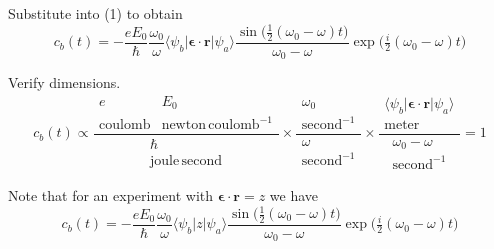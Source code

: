 Substitute into (1) to obtain
\begin{equation*}
c_b(t)=-\frac{eE_0}{\hbar}\frac{\omega_0}{\omega}
\langle\psi_b|\boldsymbol{\epsilon}\cdot\mathbf r|\psi_a\rangle
\frac{\sin\bigl(\tfrac{1}{2}(\omega_0-\omega)t\bigr)}{\omega_0-\omega}
\exp\bigl(\tfrac{i}{2}(\omega_0-\omega)t\bigr)
\end{equation*}

Verify dimensions.
\begin{equation*}
c_b(t)\propto
\frac{\begin{matrix}
e & E_0
\\
\text{coulomb} & \text{newton}\,\text{coulomb}^{-1}
\end{matrix}}
{\begin{matrix}
\hbar
\\
\text{joule}\,\text{second}
\end{matrix}}
\times
\frac{\begin{matrix}
\omega_0
\\
\text{second}^{-1}
\end{matrix}}
{\begin{matrix}
\omega
\\
\text{second}^{-1}
\end{matrix}}
\times
\frac{\begin{matrix}
\langle\psi_b|\boldsymbol{\epsilon}\cdot\mathbf r|\psi_a\rangle
\\
\text{meter}
\end{matrix}}
{\begin{matrix}
\omega_0-\omega
\\
\text{second}^{-1}
\end{matrix}}
=1
\end{equation*}

Note that for an experiment with $\boldsymbol{\epsilon}\cdot\mathbf r=z$ we have
\begin{equation*}
c_b(t)=-\frac{eE_0}{\hbar}\frac{\omega_0}{\omega}
\langle\psi_b|z|\psi_a\rangle
\frac{\sin\bigl(\tfrac{1}{2}(\omega_0-\omega)t\bigr)}{\omega_0-\omega}
\exp\bigl(\tfrac{i}{2}(\omega_0-\omega)t\bigr)
\end{equation*}


